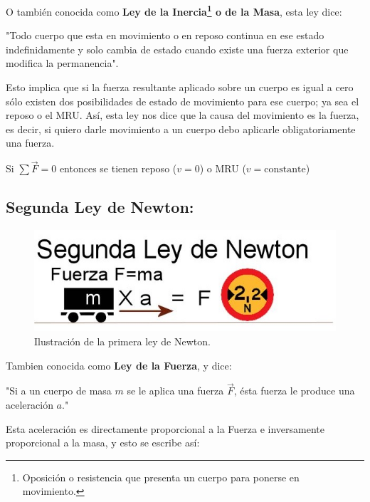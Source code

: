 O también conocida como \textbf{Ley de la Inercia\footnote{Oposición o resistencia que presenta un cuerpo para ponerse 
en movimiento.} o de la Masa}, esta ley dice:

\begin{tcolorbox}
"Todo cuerpo que esta en movimiento o en reposo continua en ese estado indefinidamente y solo cambia de estado cuando existe una 
fuerza exterior que modifica la permanencia".
\end{tcolorbox}

Esto implica que si la fuerza resultante aplicado sobre un cuerpo es igual a cero sólo existen dos posibilidades de estado de 
movimiento para ese cuerpo; ya sea el reposo o el MRU. Así, esta ley nos dice que la causa del movimiento es la fuerza, es decir, 
si quiero darle movimiento a un cuerpo debo aplicarle obligatoriamente una fuerza.

\begin{tcolorbox}
Si $\sum \vec{F} = 0$ entonces se tienen reposo ($v = 0$) o MRU ($v =  \text{constante}$)
\end{tcolorbox}

\subsection{Segunda Ley de Newton:}

\begin{figure}[ht]
 \centering
 \includegraphics[scale=0.5]{images/segunda-ley-de-newton.jpg}
 \caption{Ilustración de la primera ley de Newton.}\label{ac}
\end{figure} 

Tambien conocida como \textbf{Ley de la Fuerza}, y dice:

\begin{tcolorbox}
"Si a un cuerpo de masa $m$ se le aplica una fuerza $\vec{F}$, ésta fuerza le produce una aceleración $a$."
\end{tcolorbox}

Esta aceleración es directamente proporcional a la Fuerza e inversamente proporcional a la masa, y esto se escribe así:

